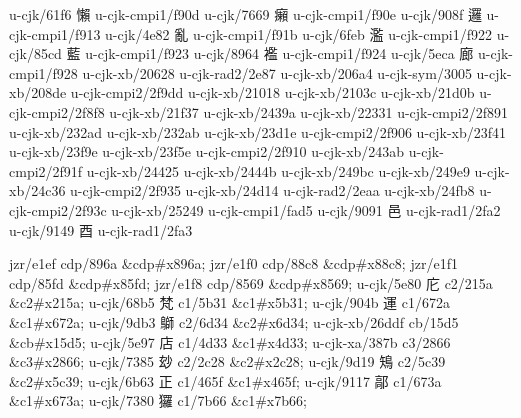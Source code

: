 \begin{multicols}{2}
u-cjk/61f6	{\cjk{}懶}	u-cjk-cmpi1/f90d	{} 
u-cjk/7669	{\cjk{}癩}	u-cjk-cmpi1/f90e	{} 
u-cjk/908f	{\cjk{}邏}	u-cjk-cmpi1/f913	{} 
u-cjk/4e82	{\cjk{}亂}	u-cjk-cmpi1/f91b	{} 
u-cjk/6feb	{\cjk{}濫}	u-cjk-cmpi1/f922	{} 
u-cjk/85cd	{\cjk{}藍}	u-cjk-cmpi1/f923	{} 
u-cjk/8964	{\cjk{}襤}	u-cjk-cmpi1/f924	{} 
u-cjk/5eca	{\cjk{}廊}	u-cjk-cmpi1/f928	{} 
u-cjk-xb/20628	{	}u-cjk-rad2/2e87	{} 
u-cjk-xb/206a4	{	}u-cjk-sym/3005	{} 
u-cjk-xb/208de	{	}u-cjk-cmpi2/2f9dd	{} 
u-cjk-xb/21018	{	}u-cjk-xb/2103c	{} 
u-cjk-xb/21d0b	{	}u-cjk-cmpi2/2f8f8	{} 
u-cjk-xb/21f37	{	}u-cjk-xb/2439a	{} 
u-cjk-xb/22331	{	}u-cjk-cmpi2/2f891	{} 
u-cjk-xb/232ad	{	}u-cjk-xb/232ab	{} 
u-cjk-xb/23d1e	{	}u-cjk-cmpi2/2f906	{} 
u-cjk-xb/23f41	{	}u-cjk-xb/23f9e	{} 
u-cjk-xb/23f5e	{	}u-cjk-cmpi2/2f910	{} 
u-cjk-xb/243ab	{	}u-cjk-cmpi2/2f91f	{} 
u-cjk-xb/24425	{	}u-cjk-xb/2444b	{} 
u-cjk-xb/249bc	{	}u-cjk-xb/249e9	{} 
u-cjk-xb/24c36	{	}u-cjk-cmpi2/2f935	{} 
u-cjk-xb/24d14	{\cjk{}}	u-cjk-rad2/2eaa	{} 
u-cjk-xb/24fb8	{	}u-cjk-cmpi2/2f93c	{} 
u-cjk-xb/25249	{	}u-cjk-cmpi1/fad5	{} 
u-cjk/9091	{\cjk{}邑}	u-cjk-rad1/2fa2	{} 
u-cjk/9149	{\cjk{}酉}	u-cjk-rad1/2fa3	{} 
\endgroup{}{}

\mktsShowpar\par
\begingroup\mktsObeyAllLines{}

\begingroup\mktsStyleCode{}jzr/e1ef	{	}cdp/896a	\&cdp\#x896a; 
jzr/e1f0	{	}cdp/88c8	\&cdp\#x88c8; 
jzr/e1f1	{	}cdp/85fd	\&cdp\#x85fd; 
jzr/e1f8	{	}cdp/8569	\&cdp\#x8569; 
u-cjk/5e80	{\cjk{}庀}	c2/215a	\&c2\#x215a;
u-cjk/68b5	{\cjk{}梵}	c1/5b31	\&c1\#x5b31;
u-cjk/904b	{\cjk{}運}	c1/672a	\&c1\#x672a;
u-cjk/9db3	{\cjk{}鶳}	c2/6d34	\&c2\#x6d34;
u-cjk-xb/26ddf	{	}cb/15d5	\&cb\#x15d5;
u-cjk/5e97	{\cjk{}店}	c1/4d33	\&c1\#x4d33;
u-cjk-xa/387b	{	}c3/2866	\&c3\#x2866;
u-cjk/7385	{\cjk{}玅}	c2/2c28	\&c2\#x2c28;
u-cjk/9d19	{\cjk{}鴙}	c2/5c39	\&c2\#x5c39;
u-cjk/6b63	{\cjk{}正}	c1/465f	\&c1\#x465f;
u-cjk/9117	{\cjk{}鄗}	c1/673a	\&c1\#x673a;
u-cjk/7380	{\cjk{}玀}	c1/7b66	\&c1\#x7b66;


\end{multicols}
